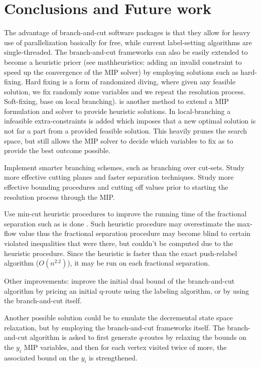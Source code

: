 \chapter{Conclusions and Future work}
\label{sec:conclusions-and-future-work}

The advantage of branch-and-cut software packages is that
they allow for heavy use of parallelization basically for free,
while current label-setting algorithms are single-threaded.
The branch-and-cut frameworks can also be easily extended
to become a heuristic pricer
(see mathheuristics: adding an invalid constraint to speed up the convergence of the MIP solver)
by employing
solutions such as hard-fixing.
Hard fixing is a form of randomized diving,
where given any feasible solution,
we fix randomly some variables and we repeat the resolution
process.
Soft-fixing, base on local branching). is another method
to extend a MIP formulation and solver to provide
heuristic solutions.
In local-branching a infeasible extra-constraints is added
which imposes that a new optimal solution
is not far a part from a provided feasible solution.
This heavily prunes the search space, but still
allows the MIP solver to decide which variables
to fix as to provide the best outcome possible.

Implement smarter branching schemes, such as branching over cut-sets.
Study more effective cutting planes and
faster separation techniques.
Study more effective bounding procedures and cutting off values
prior to starting the resolution process through the MIP.

Use min-cut heuristic procedures to improve
the running time of the fractional separation
such as is done \textcite{kernighan1970}.
Such heuristic procedure may overestimate the max-flow
value thus the fractional separation procedure may
become blind to certain violated inequalities that were
there, but couldn't be computed due to the heuristic procedure.
Since the heuristic is faster than the exact push-relabel
algorithm ($O(n^2.2)$), it may be run on each fractional
separation.

Other improvements: improve the initial dual bound of the branch-and-cut
algorithm by pricing an initial q-route using the labeling algorithm,
or by using the branch-and-cut itself.

Another possible solution could be to emulate the decremental state space
relaxation, but by employing the branch-and-cut frameworks itself.
The branch-and-cut algorithm is asked to first generate $q$-routes by
relaxing the bounds on the $y_i$ MIP variables,
and then for each vertex visited twice of more, the associated bound
on the $y_i$ is strengthened.

